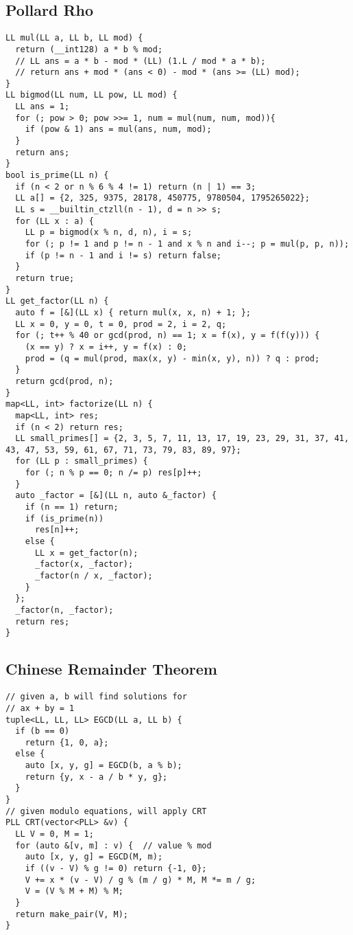 \documentclass[FSZ,a4paper,onesided]{article}
\begin{document}
\begin{multicols*}{\COLS}
\begin{lstlisting}
\end{lstlisting}
\subsection{Pollard Rho}
\begin{lstlisting}
LL mul(LL a, LL b, LL mod) {
  return (__int128) a * b % mod;
  // LL ans = a * b - mod * (LL) (1.L / mod * a * b);
  // return ans + mod * (ans < 0) - mod * (ans >= (LL) mod);
}
LL bigmod(LL num, LL pow, LL mod) {
  LL ans = 1;
  for (; pow > 0; pow >>= 1, num = mul(num, num, mod)){
    if (pow & 1) ans = mul(ans, num, mod);
  }
  return ans;
}
bool is_prime(LL n) {
  if (n < 2 or n % 6 % 4 != 1) return (n | 1) == 3;
  LL a[] = {2, 325, 9375, 28178, 450775, 9780504, 1795265022};
  LL s = __builtin_ctzll(n - 1), d = n >> s;
  for (LL x : a) {
    LL p = bigmod(x % n, d, n), i = s;
    for (; p != 1 and p != n - 1 and x % n and i--; p = mul(p, p, n));
    if (p != n - 1 and i != s) return false;
  }
  return true;
}
LL get_factor(LL n) {
  auto f = [&](LL x) { return mul(x, x, n) + 1; };
  LL x = 0, y = 0, t = 0, prod = 2, i = 2, q;
  for (; t++ % 40 or gcd(prod, n) == 1; x = f(x), y = f(f(y))) {
    (x == y) ? x = i++, y = f(x) : 0;
    prod = (q = mul(prod, max(x, y) - min(x, y), n)) ? q : prod;
  }
  return gcd(prod, n);
}
map<LL, int> factorize(LL n) {
  map<LL, int> res;
  if (n < 2) return res;
  LL small_primes[] = {2, 3, 5, 7, 11, 13, 17, 19, 23, 29, 31, 37, 41, 43, 47, 53, 59, 61, 67, 71, 73, 79, 83, 89, 97};
  for (LL p : small_primes) {
    for (; n % p == 0; n /= p) res[p]++;
  }
  auto _factor = [&](LL n, auto &_factor) {
    if (n == 1) return;
    if (is_prime(n))
      res[n]++;
    else {
      LL x = get_factor(n);
      _factor(x, _factor);
      _factor(n / x, _factor);
    }
  };
  _factor(n, _factor);
  return res;
}
\end{lstlisting}
\subsection{Chinese Remainder Theorem}
\begin{lstlisting}
// given a, b will find solutions for
// ax + by = 1
tuple<LL, LL, LL> EGCD(LL a, LL b) {
  if (b == 0)
    return {1, 0, a};
  else {
    auto [x, y, g] = EGCD(b, a % b);
    return {y, x - a / b * y, g};
  }
}
// given modulo equations, will apply CRT
PLL CRT(vector<PLL> &v) {
  LL V = 0, M = 1;
  for (auto &[v, m] : v) {  // value % mod
    auto [x, y, g] = EGCD(M, m);
    if ((v - V) % g != 0) return {-1, 0};
    V += x * (v - V) / g % (m / g) * M, M *= m / g;
    V = (V % M + M) % M;
  }
  return make_pair(V, M);
}
\end{lstlisting}

\end{multicols*}
\end{document}

